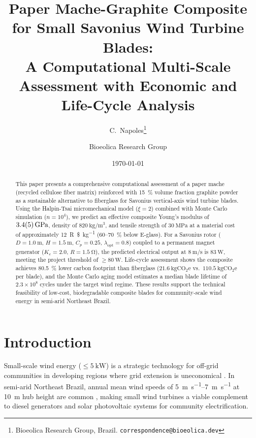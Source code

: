 \documentclass[twocolumn]{article}
\title{\textbf{Paper Mache-Graphite Composite for Small Savonius Wind Turbine Blades: \\ A Computational Multi-Scale Assessment with Economic and Life-Cycle Analysis}}
\author{
    C.\ Napoles\thanks{Bioeolica Research Group, Brazil. \texttt{correspondence@bioeolica.dev}} \\
    \and
    Bioeolica Research Group
}
\date{\today}
\newcommand{\BrazilianReal}{R\$}
\newcommand{\COtwo}{\ensuremath{\mathrm{CO_2}}\xspace}
\newcommand{\COtwoe}{\COtwo\mathrm{e}\xspace}
\begin{document}

\maketitle

\begin{abstract}
This paper presents a comprehensive computational assessment of a paper mache (recycled cellulose fiber matrix) reinforced with 15~\% volume fraction graphite powder as a sustainable alternative to fiberglass for Savonius vertical-axis wind turbine blades. Using the Halpin-Tsai micromechanical model ($\xi = 2$) combined with Monte Carlo simulation ($n = 10^4$), we predict an effective composite Young's modulus of $\SI{3.4 \pm 0.5}{\giga\pascal}$, density of $\SI{820}{\kilogram\per\cubic\meter}$, and tensile strength of $\SI{30}{\mega\pascal}$ at a material cost of approximately \SI{12}{\BrazilianReal\per\kilogram} (60--70~\% below E-glass). For a Savonius rotor ($D = \SI{1.0}{\meter}$, $H = \SI{1.5}{\meter}$, $C_p = 0.25$, $\lambda_{\mathrm{opt}} = 0.8$) coupled to a permanent magnet generator ($K_e = 2.0$, $R = \SI{1.5}{\ohm}$), the predicted electrical output at $\SI{8}{\meter\per\second}$ is $\SI{83}{\watt}$, meeting the project threshold of $\ge\SI{80}{\watt}$. Life-cycle assessment shows the composite achieves 80.5~\% lower carbon footprint than fiberglass ($\SI{21.6}{\kilogram\COtwoe}$ vs.\ $\SI{110.5}{\kilogram\COtwoe}$ per blade), and the Monte Carlo aging model estimates a median blade lifetime of $2.3\times10^8$ cycles under the target wind regime. These results support the technical feasibility of low-cost, biodegradable composite blades for community-scale wind energy in semi-arid Northeast Brazil.
\end{abstract}

\section{Introduction}
\label{sec:intro}

Small-scale wind energy ($\le\SI{5}{\kilo\watt}$) is a strategic technology for off-grid communities in developing regions where grid extension is uneconomical \cite{iec614002,owen2019}. In semi-arid Northeast Brazil, annual mean wind speeds of \SIrange{5}{7}{\meter\per\second} at \SI{10}{\meter} hub height are common \cite{sonda2023}, making small wind turbines a viable complement to diesel generators and solar photovoltaic systems for community electrification.
\end{document}
